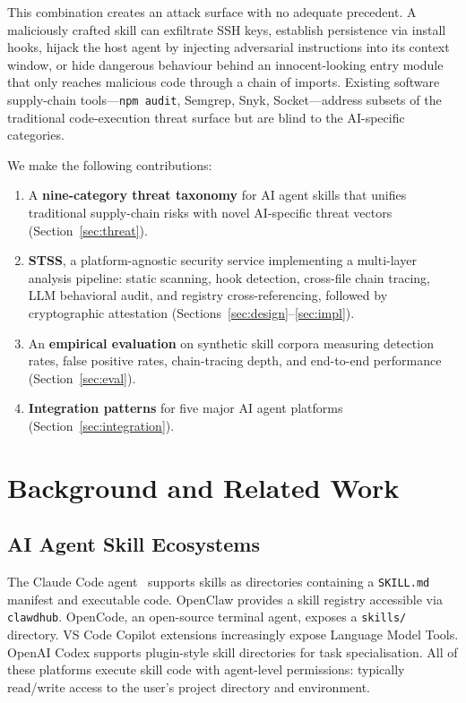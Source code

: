 \documentclass[11pt,twocolumn]{article}
\begin{document}
This combination creates an attack surface with no adequate precedent. A
maliciously crafted skill can exfiltrate SSH keys, establish persistence via
install hooks, hijack the host agent by injecting adversarial instructions into
its context window, or hide dangerous behaviour behind an innocent-looking entry
module that only reaches malicious code through a chain of imports. Existing
software supply-chain tools---\texttt{npm audit}, Semgrep, Snyk, Socket---address
subsets of the traditional code-execution threat surface but are blind to the
AI-specific categories.

We make the following contributions:

\begin{enumerate}[leftmargin=*,topsep=2pt,itemsep=1pt]
  \item A \textbf{nine-category threat taxonomy} for AI agent skills that
  unifies traditional supply-chain risks with novel AI-specific threat vectors
  (Section~\ref{sec:threat}).

  \item \textbf{STSS}, a platform-agnostic security service implementing a
  multi-layer analysis pipeline: static scanning, hook detection, cross-file
  chain tracing, LLM behavioral audit, and registry cross-referencing, followed
  by cryptographic attestation (Sections~\ref{sec:design}--\ref{sec:impl}).

  \item An \textbf{empirical evaluation} on synthetic skill corpora measuring
  detection rates, false positive rates, chain-tracing depth, and end-to-end
  performance (Section~\ref{sec:eval}).

  \item \textbf{Integration patterns} for five major AI agent platforms
  (Section~\ref{sec:integration}).
\end{enumerate}

\section{Background and Related Work}
\label{sec:related}

\subsection{AI Agent Skill Ecosystems}

The Claude Code agent~\cite{anthropic2024claudecode} supports skills as
directories containing a \texttt{SKILL.md} manifest and executable code.
OpenClaw provides a skill registry accessible via \texttt{clawdhub}. OpenCode,
an open-source terminal agent, exposes a \texttt{skills/} directory. VS Code
Copilot extensions increasingly expose Language Model Tools. OpenAI Codex
supports plugin-style skill directories for task specialisation. All of these
platforms execute skill code with agent-level permissions: typically read/write
access to the user's project directory and environment.
\end{document}
